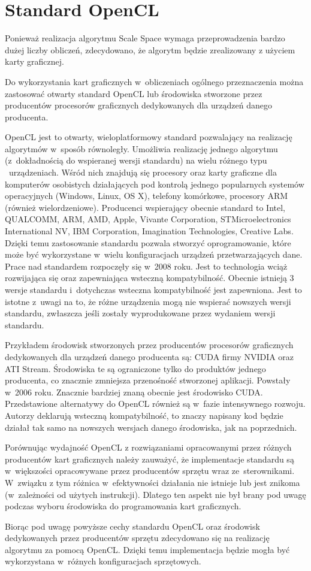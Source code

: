 \section{Standard OpenCL}
\label{sec:OpenCL}

Ponieważ realizacja algorytmu Scale Space wymaga przeprowadzenia bardzo dużej liczby obliczeń, zdecydowano, że algorytm będzie zrealizowany z użyciem karty graficznej.

Do wykorzystania kart graficznych w~obliczeniach ogólnego przeznaczenia można zastosować otwarty standard OpenCL lub środowiska stworzone przez producentów procesorów graficznych dedykowanych dla urządzeń danego producenta.

OpenCL jest to otwarty, wieloplatformowy standard pozwalający na realizację algorytmów w~sposób równoległy. Umożliwia realizację jednego algorytmu (z~dokładnością do wspieranej wersji standardu) na wielu różnego typu ~urządzeniach. Wśród nich znajdują się procesory oraz karty graficzne dla komputerów osobistych działających
 pod kontrolą jednego popularnych systemów operacyjnych (Windows, Linux, OS X), telefony komórkowe, procesory ARM (również wielordzeniowe). Producenci wspierający obecnie standard to Intel,
QUALCOMM,
ARM,
AMD,
Apple,
Vivante Corporation,
STMicroelectronics International NV,
IBM Corporation,
Imagination Technologies,
Creative Labs.
Dzięki temu zastosowanie standardu pozwala stworzyć oprogramowanie, które może być wykorzystane w~wielu konfiguracjach urządzeń przetwarzających dane. Prace nad standardem rozpoczęły się w~2008 roku. Jest to technologia wciąż rozwijająca się oraz zapewniająca wsteczną kompatybilność. Obecnie istnieją 3 wersje standardu i~dotychczas wsteczna kompatybilność jest zapewniona. Jest to istotne z~uwagi na to, że różne urządzenia mogą nie wspierać nowszych wersji standardu, zwłaszcza jeśli zostały wyprodukowane przez wydaniem wersji standardu.

Przykładem środowisk stworzonych przez producentów procesorów graficznych dedykowanych dla urządzeń danego producenta są: CUDA firmy NVIDIA oraz ATI Stream. Środowiska te są ograniczone tylko do produktów jednego producenta, co znacznie zmniejsza przenośność stworzonej aplikacji. Powstały w~2006 roku. Znacznie bardziej znaną obecnie jest środowisko CUDA. Przedstawione alternatywy do OpenCL również są w~fazie intensywnego rozwoju. Autorzy deklarują  wsteczną kompatybilność, to znaczy napisany kod będzie działał tak samo na nowszych wersjach danego środowiska, jak na poprzednich.

Porównując wydajność OpenCL z rozwiązaniami opracowanymi przez różnych producentów kart graficznych należy zauważyć, że implementacje standardu są w~większości opracowywane przez producentów sprzętu wraz ze~sterownikami. W~związku z tym różnica w~efektywności działania nie istnieje lub jest znikoma (w~zależności od użytych instrukcji)\cite{FromCudaToOpenCL}. Dlatego ten aspekt nie był brany pod uwagę podczas wyboru środowiska do programowania kart graficznych.

Biorąc pod uwagę powyższe cechy standardu OpenCL oraz środowisk dedykowanych przez producentów sprzętu zdecydowano się na realizację algorytmu za pomocą OpenCL. Dzięki temu implementacja będzie mogła być wykorzystana w~różnych konfiguracjach sprzętowych.

